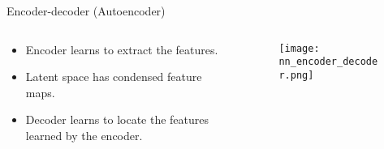 \documentclass[10pt,aspectratio=169,dvipsnames]{beamer} %
\begin{document}
	\setcounter{subfigure}{0}
	\begin{frame}{Encoder-decoder (Autoencoder)}
		\begin{columns}[T]
			\begin{column}[t]{.35\textwidth}
				\begin{itemize}
					\item \alert{Encoder} learns to extract the features.
					\item \alert{Latent space} has condensed feature maps.
					\item \alert{Decoder} learns to locate the features learned by the encoder.
				\end{itemize}	
			\end{column}
			\hfill
			\begin{column}[t]{.6\textwidth}
				\begin{figure}
					\centering
					\texttt{[image: nn\_encoder\_decoder.png]}
				\end{figure}	
			\end{column}
		\end{columns}			
	\end{frame}
	\setcounter{subfigure}{0}
\end{document}
